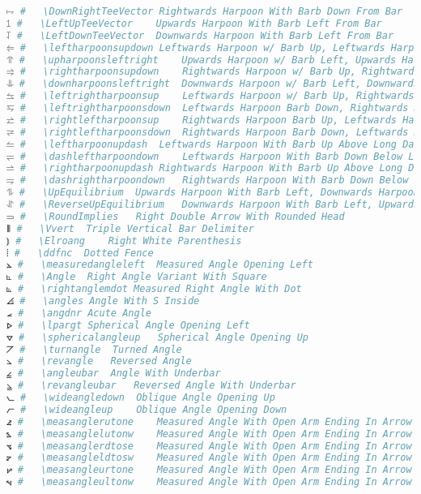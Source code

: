 \begin{lstlisting}[language=Julia, style=julia, linewidth=\textwidth]
⥟ #   \DownRightTeeVector Rightwards Harpoon With Barb Down From Bar
⥠ #   \LeftUpTeeVector    Upwards Harpoon With Barb Left From Bar
⥡ #   \LeftDownTeeVector  Downwards Harpoon With Barb Left From Bar
⥢ #   \leftharpoonsupdown Leftwards Harpoon w/ Barb Up, Leftwards Harpoon w/ Barb Down
⥣ #   \upharpoonsleftright    Upwards Harpoon w/ Barb Left, Upwards Harpoon w/ Barb Right
⥤ #   \rightharpoonsupdown    Rightwards Harpoon w/ Barb Up, Rightwards Harpoon Barb Down
⥥ #   \downharpoonsleftright  Downwards Harpoon w/ Barb Left, Downwards Harpoon Barb Right
⥦ #   \leftrightharpoonsup    Leftwards Harpoon w/ Barb Up, Rightwards Harpoon w/ Barb Up
⥧ #   \leftrightharpoonsdown  Leftwards Harpoon Barb Down, Rightwards Harpoon Barb Down
⥨ #   \rightleftharpoonsup    Rightwards Harpoon Barb Up, Leftwards Harpoon With Barb Up
⥩ #   \rightleftharpoonsdown  Rightwards Harpoon Barb Down, Leftwards Harpoon Barb Down
⥪ #   \leftharpoonupdash  Leftwards Harpoon With Barb Up Above Long Dash
⥫ #   \dashleftharpoondown    Leftwards Harpoon With Barb Down Below Long Dash
⥬ #   \rightharpoonupdash Rightwards Harpoon With Barb Up Above Long Dash
⥭ #   \dashrightharpoondown   Rightwards Harpoon With Barb Down Below Long Dash
⥮ #   \UpEquilibrium  Upwards Harpoon With Barb Left, Downwards Harpoon With Barb Right
⥯ #   \ReverseUpEquilibrium   Downwards Harpoon With Barb Left, Upwards Harpoon Barb Right
⥰ #   \RoundImplies   Right Double Arrow With Rounded Head
⦀ #   \Vvert  Triple Vertical Bar Delimiter
⦆ #   \Elroang    Right White Parenthesis
⦙ #   \ddfnc  Dotted Fence
⦛ #   \measuredangleleft  Measured Angle Opening Left
⦜ #   \Angle  Right Angle Variant With Square
⦝ #   \rightanglemdot Measured Right Angle With Dot
⦞ #   \angles Angle With S Inside
⦟ #   \angdnr Acute Angle
⦠ #   \lpargt Spherical Angle Opening Left
⦡ #   \sphericalangleup   Spherical Angle Opening Up
⦢ #   \turnangle  Turned Angle
⦣ #   \revangle   Reversed Angle
⦤ #   \angleubar  Angle With Underbar
⦥ #   \revangleubar   Reversed Angle With Underbar
⦦ #   \wideangledown  Oblique Angle Opening Up
⦧ #   \wideangleup    Oblique Angle Opening Down
⦨ #   \measanglerutone    Measured Angle With Open Arm Ending In Arrow Up And Right
⦩ #   \measanglelutonw    Measured Angle With Open Arm Ending In Arrow Up And Left
⦪ #   \measanglerdtose    Measured Angle With Open Arm Ending In Arrow Down And Right
⦫ #   \measangleldtosw    Measured Angle With Open Arm Ending In Arrow Down And Left
⦬ #   \measangleurtone    Measured Angle With Open Arm Ending In Arrow Right And Up
⦭ #   \measangleultonw    Measured Angle With Open Arm Ending In Arrow Left And Up

\end{lstlisting}
